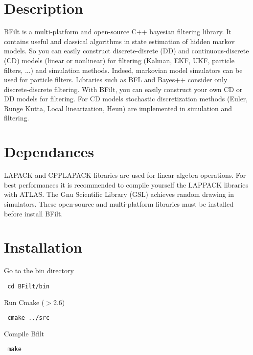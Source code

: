 \hypertarget{index_description}{}\section{Description}\label{index_description}
BFilt is a multi-platform and open-source C++ bayesian filtering library. It contains useful and classical algorithms in state estimation of hidden markov models. So you can easily construct discrete-disrete (DD) and continuous-discrete (CD) models (linear or nonlinear) for filtering (Kalman, EKF, UKF, particle filters, ...) and simulation methods. Indeed, markovian model simulators can be used for particle filters. Libraries such as BFL and Bayes++ consider only discrete-discrete filtering. With BFilt, you can easily construct your own CD or DD models for filtering. For CD models stochastic discretization methods (Euler, Runge Kutta, Local linearization, Heun) are implemented in simulation and filtering.\hypertarget{index_implementation}{}\section{Dependances}\label{index_implementation}
LAPACK and CPPLAPACK libraries are used for linear algebra operations. For best performances it is recommended to compile yourself the LAPPACK libraries with ATLAS. The Gnu Scientific Library (GSL) achieves random drawing in simulators. These open-source and multi-platform libraries must be installed before install BFilt.\hypertarget{index_Installation}{}\section{Installation}\label{index_Installation}
Go to the bin directory 

\begin{Code}\begin{verbatim} cd BFilt/bin
\end{verbatim}
\end{Code}

 Run Cmake ($>$2.6) 

\begin{Code}\begin{verbatim} cmake ../src
\end{verbatim}
\end{Code}

 Compile Bfilt 

\begin{Code}\begin{verbatim} make
\end{verbatim}
\end{Code}

